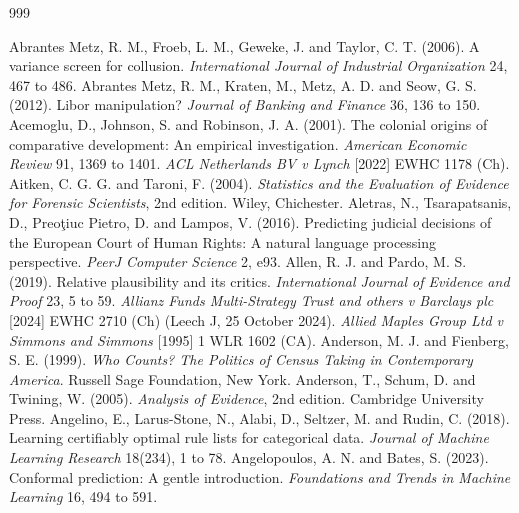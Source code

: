 \renewcommand{\bibname}{References}
\begingroup
\small
\setlength{\bibsep}{3pt}
\begin{thebibliography}{999}

 Abrantes Metz, R. M., Froeb, L. M., Geweke, J. and Taylor, C. T. (2006). A variance screen for collusion. \emph{International Journal of Industrial Organization} 24, 467 to 486.
 Abrantes Metz, R. M., Kraten, M., Metz, A. D. and Seow, G. S. (2012). Libor manipulation? \emph{Journal of Banking and Finance} 36, 136 to 150.
 Acemoglu, D., Johnson, S. and Robinson, J. A. (2001). The colonial origins of comparative development: An empirical investigation. \emph{American Economic Review} 91, 1369 to 1401.
 \emph{ACL Netherlands BV v Lynch} [2022] EWHC 1178 (Ch).
 Aitken, C. G. G. and Taroni, F. (2004). \emph{Statistics and the Evaluation of Evidence for Forensic Scientists}, 2nd edition. Wiley, Chichester.
 Aletras, N., Tsarapatsanis, D., Preo\c{t}iuc Pietro, D. and Lampos, V. (2016). Predicting judicial decisions of the European Court of Human Rights: A natural language processing perspective. \emph{PeerJ Computer Science} 2, e93.
 Allen, R. J. and Pardo, M. S. (2019). Relative plausibility and its critics. \emph{International Journal of Evidence and Proof} 23, 5 to 59.
 \emph{Allianz Funds Multi-Strategy Trust and others v Barclays plc} [2024] EWHC 2710 (Ch) (Leech J, 25 October 2024).
 \emph{Allied Maples Group Ltd v Simmons and Simmons} [1995] 1 WLR 1602 (CA).
 Anderson, M. J. and Fienberg, S. E. (1999). \emph{Who Counts? The Politics of Census Taking in Contemporary America}. Russell Sage Foundation, New York.
 Anderson, T., Schum, D. and Twining, W. (2005). \emph{Analysis of Evidence}, 2nd edition. Cambridge University Press.
 Angelino, E., Larus-Stone, N., Alabi, D., Seltzer, M. and Rudin, C. (2018). Learning certifiably optimal rule lists for categorical data. \emph{Journal of Machine Learning Research} 18(234), 1 to 78.
 Angelopoulos, A. N. and Bates, S. (2023). Conformal prediction: A gentle introduction. \emph{Foundations and Trends in Machine Learning} 16, 494 to 591.

\end{thebibliography}
